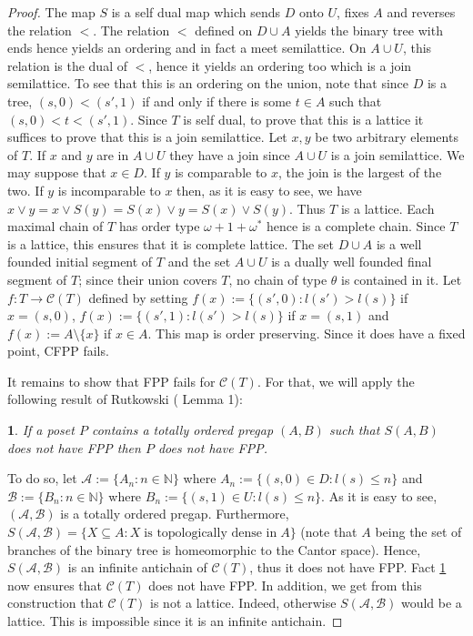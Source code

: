 \documentclass[12pt]{amsart}
\newtheorem{fact}[definition]{\noindent {\bf Fact}}
\begin{document}
\begin{proof}
The map $S$ is a self dual map which sends $D$ onto $U$, fixes $A$ and
reverses the relation $<$.  The relation $<$ defined on $D\cup A$
yields the binary tree with ends hence yields an ordering and in fact
a meet semilattice. On $A\cup U$, this relation is the dual of $<$,
hence it yields an ordering too which is a join semilattice. To see
that this is an ordering on the union, note that since $D$ is a tree,
$(s, 0)< (s', 1)$ if and only if there is some $t\in A$ such that
$(s,0)<t<(s', 1)$.  Since $T$ is self dual, to prove that this is a
lattice it suffices to prove that this is a join semilattice. Let $x,
y $ be two arbitrary elements of $T$. If $x$ and $y$ are in $A\cup U$
they have a join since $A\cup U$ is a join semilattice. We may suppose
that $x\in D$. If $y$ is comparable to $x$, the join is the largest of
the two. If $y$ is incomparable to $x$ then, as it is easy to see, we
have $x\vee y=x\vee S(y)=S(x)\vee y= S(x)\vee S(y)$. Thus $T$ is a
lattice.  Each maximal chain of $T$ has order type $\omega+1+
\omega^*$ hence is a complete chain. Since $T$ is a lattice, this
ensures that it is complete lattice. The set $D\cup A$ is a well
founded initial segment of $T$ and the set $A\cup U$ is a dually well
founded final segment of $T$; since their union covers $T$, no chain
of type $\theta $ is contained in it.  Let $f: T\rightarrow \mathcal
C(T)$ defined by setting $f(x):= \{(s', 0): l(s')>l(s)\}$ if
$x=(s, 0)$, $f(x):= \{(s', 1): l(s')>l(s)\}$ if $x=(s, 1)$ and $f(x):=
A\setminus \{x\}$ if $x\in A$. This map is order preserving. Since it
does have a fixed point, CFPP fails. 

\medskip

It remains to show that  FPP fails for $\mathcal C (T)$. For
that, we will apply the following result of Rutkowski (\cite{R} Lemma 1):

\begin{fact} \label{fact:rutkowski}
If a poset $P$ contains a totally ordered pregap $( A, B)$ such that
$S( A, B)$ does not have FPP then $P$ does not have FPP.
\end {fact}

To do so, let $\mathcal A:=\{A_n: n\in {\mathbb{N}}\}$ where $A_n:= \{(s,0)\in D: l(s)\leq
n \}$ and $\mathcal B:=\{B_n: n\in {\mathbb{N}}\}$ where $B_n:= \{(s,1)\in U:
l(s)\leq n \}$. As it is easy to see, $(\mathcal A, \mathcal B)$ is a
totally ordered pregap. Furthermore, $S(\mathcal A, \mathcal
B)=\{X\subseteq A: X \;\text{is topologically dense in} \; A\}$ (note
that $A$ being the set of branches of the binary tree is homeomorphic
to the Cantor space). Hence, $S(\mathcal A, \mathcal B)$ is an
infinite antichain of $\mathcal C(T)$, thus it does not have
FPP. Fact \ref{fact:rutkowski} now ensures that $\mathcal C (T)$ does
not have FPP. In addition, we get from this construction that
$\mathcal C (T)$ is not a lattice. Indeed, otherwise $S(\mathcal A,
\mathcal B)$ would be a lattice. This is impossible since it is an
infinite antichain.  \end{proof}
\end{document}
